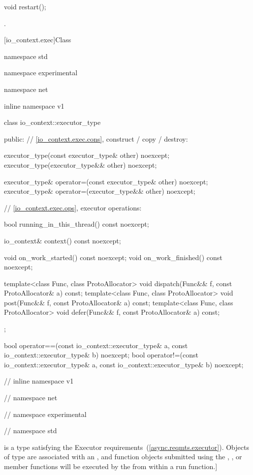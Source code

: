 %
\begin{itemdecl}
void restart();
\end{itemdecl}

\begin{itemdescr}
\pnum
\postconditions {}.
\end{itemdescr}




[io_context.exec]{Class }

%
\begin{codeblock}
namespace std {
namespace experimental {
namespace net {
inline namespace v1 {

  class io_context::executor_type
  {
  public:
    // \ref{io_context.exec.cons}, construct / copy / destroy:

    executor_type(const executor_type& other) noexcept;
    executor_type(executor_type&& other) noexcept;

    executor_type& operator=(const executor_type& other) noexcept;
    executor_type& operator=(executor_type&& other) noexcept;

    // \ref{io_context.exec.ops}, executor operations:

    bool running_in_this_thread() const noexcept;

    io_context& context() const noexcept;

    void on_work_started() const noexcept;
    void on_work_finished() const noexcept;

    template<class Func, class ProtoAllocator>
      void dispatch(Func&& f, const ProtoAllocator& a) const;
    template<class Func, class ProtoAllocator>
      void post(Func&& f, const ProtoAllocator& a) const;
    template<class Func, class ProtoAllocator>
      void defer(Func&& f, const ProtoAllocator& a) const;
  };

  bool operator==(const io_context::executor_type& a,
                  const io_context::executor_type& b) noexcept;
  bool operator!=(const io_context::executor_type& a,
                  const io_context::executor_type& b) noexcept;

} // inline namespace v1
} // namespace net
} // namespace experimental
} // namespace std
\end{codeblock}

\pnum
{} is a type satisfying the Executor requirements~(\ref{async.reqmts.executor}). Objects of type  are associated with an , and function objects submitted using the , , or  member functions will be executed by the  from within a run function.]


